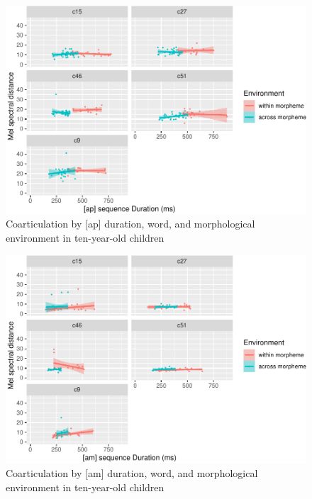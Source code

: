 \documentclass[
]{article}
\begin{document}
\begin{figure}
\centering
\includegraphics{3_ch3_results_files/figure-latex/ten-facet-ap-1.pdf}
\caption{\label{fig:ten-facet-ap}Coarticulation by {[}ap{]} duration, word, and morphological environment in ten-year-old children}
\end{figure}

\begin{figure}
\centering
\includegraphics{3_ch3_results_files/figure-latex/ten-facet-am-1.pdf}
\caption{\label{fig:ten-facet-am}Coarticulation by {[}am{]} duration, word, and morphological environment in ten-year-old children}
\end{figure}
\end{document}
